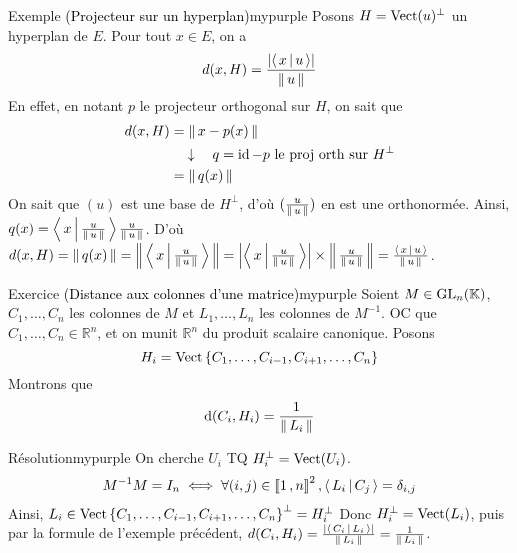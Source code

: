         \begin{omed}{Exemple \textcolor{black}{(Projecteur sur un hyperplan)}}{mypurple}
            Posons $H = \operatorname{Vect}(u)^{\perp}$ un hyperplan de $E$. Pour tout $x \in E$, on a 
            \[ d(x,H) = \frac{\left\lvert \left<\,x\,\middle|\,u\,\right>\right\rvert}{\left\lVert\,u\,\right\rVert} \]    
            En effet, en notant $p$ le projecteur orthogonal sur $H$, on sait que 
            \begin{align*}
                d(x,H)
                &= \left\lVert\,x - p(x)\,\right\rVert \\
                &\quad \downarrow \quad q = \operatorname{id} - p \text{ le proj orth sur } H^{\perp} \\
                &= \left\lVert\,q(x)\,\right\rVert
            \end{align*}
            On sait que $(u)$ est une base de $H^{\perp}$, d’où $(\frac{u}{\left\lVert\,u\,\right\rVert})$ en est une orthonormée. Ainsi, $q(x) = \left<\,x\,\middle|\,\frac{u}{\left\lVert\,u\,\right\rVert}\,\right> \frac{u}{\left\lVert\,u\,\right\rVert}$. D’où $d(x,H) = \left\lVert\,q(x)\,\right\rVert = \left\lVert\,\left<\,x\,\middle|\,\frac{u}{\left\lVert\,u\,\right\rVert}\,\right>\,\right\rVert = \left\lvert \left<\,x\,\middle|\,\frac{u}{\left\lVert\,u\,\right\rVert}\,\right>\right\rvert\times \left\lVert\,\frac{u}{\left\lVert\,u\,\right\rVert}\,\right\rVert = \frac{\left<\,x\,\middle|\,u\,\right>}{\left\lVert\,u\,\right\rVert}$.
        \end{omed}

        \begin{omed}{Exercice \textcolor{black}{(Distance aux colonnes d’une matrice)}}{mypurple}
            Soient $M \in \operatorname{GL}_n(\mathbb{K})$, $C_1,\ldots,C_n$ les colonnes de $M$ et $L_1,\ldots,L_n$ les colonnes de $M^{-1}$. OC que $C_1,\ldots, C_n \in \mathbb{R}^n$, et on munit $\mathbb{R}^n$ du produit scalaire canonique. Posons 
            \[ H_i = \operatorname{Vect}\left\{C_1,\ldots, C_{i-1}, C_{i+1}, \ldots, C_n\right\} \]   
            Montrons que 
            \[ \operatorname{d}(C_i, H_i) = \frac{1}{\left\lVert\,L_i\,\right\rVert} \]
        \end{omed}

        \begin{demo}{Résolution}{mypurple}
            On cherche $U_i$ TQ $H_i^{\perp} = \operatorname{Vect}(U_i)$. 
            \begin{align*}
                M^{-1} M = I_n 
                &\iff \forall (i,j) \in \left\llbracket 1 \, , n \right\rrbracket^2, \left<\,L_i\,\middle|\,C_j\,\right> = \delta_{i,j} \\
            \end{align*}
            Ainsi, $L_i \in \operatorname{Vect}\left\{C_1,\ldots,C_{i-1},C_{i+1},\ldots,C_n\right\}^{\perp} = H_i^{\perp}$
            Donc $H_i^{\perp} = \operatorname{Vect}(L_i)$, puis par la formule de l’exemple précédent, $d(C_i,H_i) = \frac{\left\lvert \left<\,C_i\,\middle|\,L_i\,\right>\right\rvert}{\left\lVert\,L_i\,\right\rVert} = \frac{1}{\left\lVert\,L_i\,\right\rVert}$.
        \end{demo}

